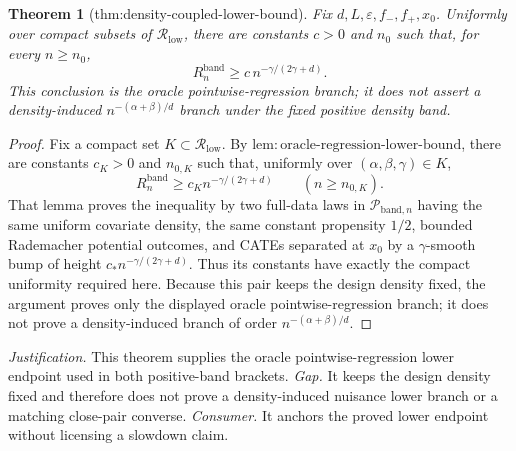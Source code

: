 \documentclass{article}
\newtheorem{theorem}{Theorem}
\begin{document}
\begin{theorem}[thm:density-coupled-lower-bound]\label{thm:density-coupled-lower-bound}
Fix \(d,L,\varepsilon,f_{-},f_{+},x_0\).  Uniformly over compact subsets of \(\mathcal R_{\mathrm{low}}\), there are constants \(c>0\) and \(n_0\) such that, for every \(n\geq n_0\),
\[
R_n^{\mathrm{band}}\geq c\,n^{-\gamma/(2\gamma+d)}.
\]
This conclusion is the oracle pointwise-regression branch; it does not assert a density-induced \(n^{-(\alpha+\beta)/d}\) branch under the fixed positive density band.
\end{theorem}
\begin{proof}
Fix a compact set \(K\subset\mathcal R_{\mathrm{low}}\).  By
\(\mathrm{lem:oracle\mbox{-}regression\mbox{-}lower\mbox{-}bound}\), there
are constants \(c_K>0\) and \(n_{0,K}\) such that, uniformly over
\((\alpha,\beta,\gamma)\in K\),
\[
R_n^{\mathrm{band}}\geq c_K n^{-\gamma/(2\gamma+d)}
\qquad(n\geq n_{0,K}).
\]
That lemma proves the inequality by two full-data laws in
\(\mathcal P_{\mathrm{band},n}\) having the same uniform covariate density,
the same constant propensity \(1/2\), bounded Rademacher potential outcomes,
and CATEs separated at \(x_0\) by a \(\gamma\)-smooth bump of height
\(c_*n^{-\gamma/(2\gamma+d)}\).  Thus its constants have exactly the compact
uniformity required here.  Because this pair keeps the design density fixed,
the argument proves only the displayed oracle pointwise-regression branch; it
does not prove a density-induced branch of order
\(n^{-(\alpha+\beta)/d}\).
\end{proof}
\par\smallskip\noindent \textit{Justification.} This theorem supplies the oracle pointwise-regression lower endpoint used in both positive-band brackets. \textit{Gap.} It keeps the design density fixed and therefore does not prove a density-induced nuisance lower branch or a matching close-pair converse. \textit{Consumer.} It anchors the proved lower endpoint without licensing a slowdown claim.
\end{document}
